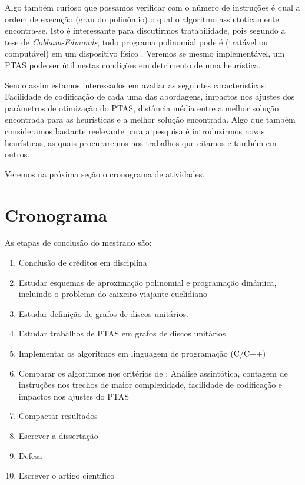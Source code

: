 Algo também curioso que possamos verificar com o número de instruções é qual a ordem de execução (grau do polinômio) o qual o algoritmo assintoticamente encontra-se. Isto é interessante para discutirmos tratabilidade, pois segundo a tese de \textit{Cobham-Edmonds}, todo programa polinomial pode é (tratável ou computável) em um dispositivo físico \cite{homer}. Veremos se mesmo implementável, um PTAS pode ser útil nestas condições em detrimento de uma heurística.

Sendo assim estamos interessados em avaliar as seguintes características: Facilidade de codificação de cada uma das abordagens, impactos nos ajustes dos parâmetros de otimização do PTAS, distância média entre a melhor solução encontrada para as heurísticas e a melhor solução encontrada. Algo que também consideramos bastante reelevante para a pesquisa é introduzirmos novas heurísticas, as quais procuraremos nos trabalhos que citamos e também em outros.

Veremos na próxima seção o cronograma de atividades.

\section{Cronograma}
\label{sec:cronograma}

As etapas de conclusão do mestrado são:

\begin{enumerate}
\item Conclusão de créditos em disciplina
\item Estudar esquemas de aproximação polinomial e programação dinâmica, incluindo o problema do caixeiro viajante euclidiano
\item Estudar definição de grafos de discos unitários.
\item Estudar trabalhos de PTAS em grafos de discos unitários
\item Implementar os algoritmos em linguagem de programação (C/C++)
\item Comparar os algoritmos nos critérios de : Análise assintótica, contagem de instruções nos trechos de maior complexidade, facilidade de codificação e impactos nos ajustes do PTAS
\item Compactar resultados
\item Escrever a dissertação
\item Defesa
\item Escrever o artigo científico
\end{enumerate}

